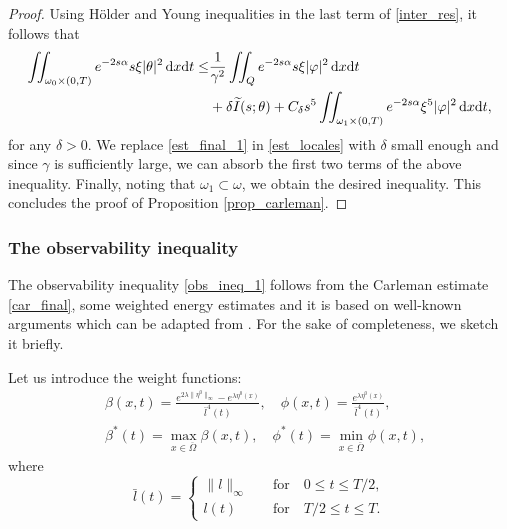 \documentclass{aims}
\theoremstyle{definition}
\def\dx{\,\textnormal{d}x}
\def\dt{\textnormal{d}t}
\begin{document}
\begin{proof}
Using H\"older and Young inequalities in the last term of \eqref{inter_res}, it follows that
%
\begin{equation}\label{est_final_1}
\begin{split}
\iint_{\omega_0\times(0,T)}e^{-2s\alpha}s\xi|\theta|^2\dx\dt\leq& \frac{1}{\gamma^2}\iint_{Q}e^{-2s\alpha}s\xi |\varphi|^2\dx\dt\\
&+\delta \widetilde I(s;\theta)+C_{\delta}s^5\iint_{\omega_1\times(0,T)}e^{-2s\alpha}\xi^5|\varphi|^2\dx\dt,
\end{split}
\end{equation}
%
for any $\delta>0$. We replace \eqref{est_final_1} in \eqref{est_locales} with $\delta$ small enough and  since $\gamma$ is sufficiently large, we can absorb the first two terms of the above inequality. Finally, noting that $\omega_1\subset \omega$, we obtain the desired inequality. This concludes the proof of Proposition \ref{prop_carleman}.
%
\end{proof}

\subsubsection*{The observability inequality}

The observability inequality \eqref{obs_ineq_1} follows from the Carleman estimate \eqref{car_final}, some weighted energy estimates and it is based on well-known arguments which can be adapted from \cite[Lemma 1]{cara_NS}. For the sake of completeness, we sketch it briefly. 

Let us introduce the weight functions:
%
\begin{equation}\label{weights_rec} 
\begin{split}
&\beta(x,t)= \frac{e^{2\lambda\|\eta^0\|_\infty}-e^{\lambda\eta^0(x)}}{\bar l^4(t)}, \quad \phi(x,t)=\frac{e^{\lambda \eta^0(x)}}{\bar l^4(t)}, \\
&\beta^*(t)=\max_{x\in\overline{\Omega}}\beta(x,t), \quad \phi^*(t)=\min_{x\in\overline\Omega} \phi(x,t),
\end{split}
\end{equation}
%
where 
\begin{equation*}
\bar l(t)=
\begin{cases}
\|l\|_\infty &\quad\text{for}\quad 0\leq t\leq T/2, \\
l(t) &\quad\text{for}\quad T/2\leq t\leq T. 
\end{cases}
\end{equation*}
\end{document}
